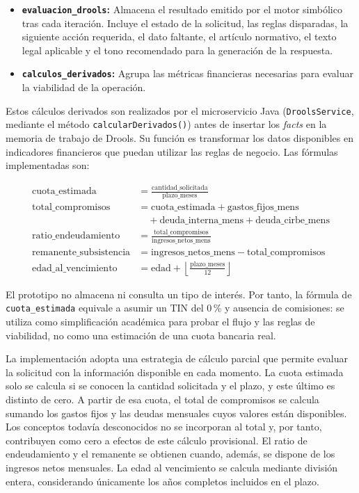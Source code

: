 \documentclass[12pt,a4paper]{report}
\begin{document}
\begin{itemize}
    \item \textbf{\texttt{evaluacion\_drools}:} Almacena el resultado emitido por el motor simbólico tras cada iteración. Incluye el estado de la solicitud, las reglas disparadas, la siguiente acción requerida, el dato faltante, el artículo normativo, el texto legal aplicable y el tono recomendado para la generación de la respuesta.
    
    \item \textbf{\texttt{calculos\_derivados}:} Agrupa las métricas financieras necesarias para evaluar la viabilidad de la operación.
\end{itemize}

Estos cálculos derivados son realizados por el microservicio Java (\texttt{DroolsService}, mediante el método \texttt{calcularDerivados()}) antes de insertar los \textit{facts} en la memoria de trabajo de Drools. Su función es transformar los datos disponibles en indicadores financieros que puedan utilizar las reglas de negocio. Las fórmulas implementadas son:

\begin{align}
\text{cuota\_estimada} &= \frac{\text{cantidad\_solicitada}}{\text{plazo\_meses}} \\[2mm]
\text{total\_compromisos} &= \text{cuota\_estimada} + \text{gastos\_fijos\_mens} \nonumber \\
&\quad + \text{deuda\_interna\_mens} + \text{deuda\_cirbe\_mens} \\[2mm]
\text{ratio\_endeudamiento} &= \frac{\text{total\_compromisos}}{\text{ingresos\_netos\_mens}} \\[2mm]
\text{remanente\_subsistencia} &= \text{ingresos\_netos\_mens} - \text{total\_compromisos} \\[2mm]
\text{edad\_al\_vencimiento} &= \text{edad} + \left\lfloor \frac{\text{plazo\_meses}}{12} \right\rfloor
\end{align}

El prototipo no almacena ni consulta un tipo de interés. Por tanto, la fórmula de \texttt{cuota\_estimada} equivale a asumir un TIN del 0\,\% y ausencia de comisiones: se utiliza como simplificación académica para probar el flujo y las reglas de viabilidad, no como una estimación de una cuota bancaria real.

La implementación adopta una estrategia de cálculo parcial que permite evaluar la solicitud con la información disponible en cada momento. La cuota estimada solo se calcula si se conocen la cantidad solicitada y el plazo, y este último es distinto de cero. A partir de esa cuota, el total de compromisos se calcula sumando los gastos fijos y las deudas mensuales cuyos valores están disponibles. Los conceptos todavía desconocidos no se incorporan al total y, por tanto, contribuyen como cero a efectos de este cálculo provisional. El ratio de endeudamiento y el remanente se obtienen cuando, además, se dispone de los ingresos netos mensuales. La edad al vencimiento se calcula mediante división entera, considerando únicamente los años completos incluidos en el plazo.
\end{document}
